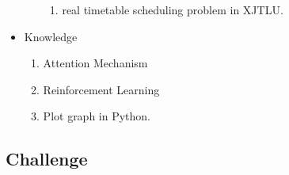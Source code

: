 \documentclass{article}
\begin{document}
\begin{itemize}
\begin{enumerate}
\begin{enumerate}
			            \item real timetable scheduling problem in XJTLU.
		            \end{enumerate}
	      \end{enumerate}
	\item Knowledge
	      \begin{enumerate}
		      \item Attention Mechanism
		      \item Reinforcement Learning
		      \item Plot graph in Python.
	      \end{enumerate}
\end{itemize}

\subsection{Challenge}


\newpage



\end{document}

